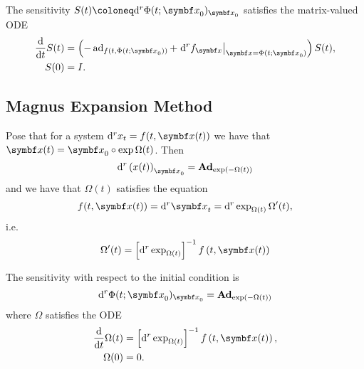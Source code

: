 \begin{important}
  The sensitivity $S(t) \coloneq \mathrm{d}^r \Phi(t; \x_{0})_{\x_{0}}$ satisfies the matrix-valued ODE
  \begin{equation}
    \label{eq:sensitivity_direct}
    \begin{aligned}
      \frac{\mathrm{d}}{\mathrm{d}t} S(t) & = \left(-\ad_{f(t, \Phi(t; \x_{0}))} + \left. \mathrm{d}^{r} f_{\x} \right|_{\x = \Phi(t; \x_{0})} \right) S(t), \\
      S(0)                                & = I.
    \end{aligned}
  \end{equation}
\end{important}

\subsection{Magnus Expansion Method}

Pose that for a system $\mathrm{d}^{r} x_{t} = f(t, \x(t))$ we have that $\x(t) = \x_{0} \circ \exp \Omega(t)$. Then
\begin{equation}
  \mathrm{d}^{r} \left(x(t)\right)_{\x_{0}} = \bAd_{\exp(-\Omega(t))}
\end{equation}
and we have that $\Omega(t)$ satisfies the equation
\begin{equation}
  f(t, \x(t)) = \mathrm{d}^{r} \x_{t} = \mathrm{d}^{r} \exp_{\Omega(t)} \Omega'(t),
\end{equation}
i.e.
\begin{equation}
  \Omega'(t) = \left[ \mathrm{d}^{r} \exp_{\Omega(t)} \right]^{-1} f \left( t, \x(t) \right)
\end{equation}


\begin{important}
  The sensitivity with respect to the initial condition is
  \begin{equation}
    \label{eq:sensitivity_magnus}
    \mathrm{d}^{r} \Phi(t; \x_{0})_{\x_{0}} = \bAd_{\exp(-\Omega(t))}
  \end{equation}
  where $\Omega$ satisfies the ODE
  \begin{equation}
    \begin{aligned}
      \frac{\mathrm{d}}{\mathrm{d}t} \Omega(t) & = \left[ \mathrm{d}^{r} \exp_{\Omega(t)} \right]^{-1} f \left( t, \x(t) \right), \\
      \Omega(0)                                & = 0.
    \end{aligned}
  \end{equation}
\end{important}

